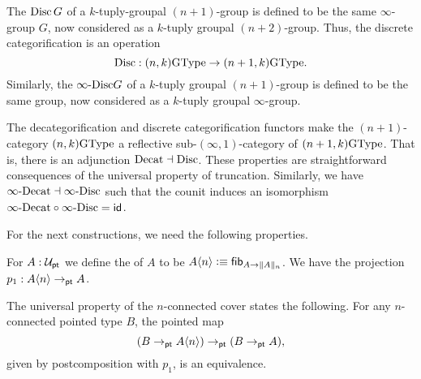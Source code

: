 \begin{defn}
The  $\Disc G$ of a $k$-tuply-groupal $(n+1)$-group is defined to be the same $\infty$-group $G$, now considered as a $k$-tuply groupal $(n+2)$-group. Thus, the discrete categorification is an operation
\begin{equation*}
\Disc : (n,k)\GType \to (n+1,k)\GType.
\end{equation*}
Similarly, the  $\iDisc G$ of a $k$-tuply groupal $(n+1)$-group is defined to be the same group, now considered as a $k$-tuply groupal $\infty$-group.
\end{defn}

\begin{rmk}
The decategorification and discrete categorification functors make the $(n+1)$-category $(n,k)\GType$ a reflective sub-$(\infty,1)$-category of $(n+1,k)\GType$. That is, there is an adjunction ${\Decat} \dashv {\Disc}$. These properties are straightforward consequences of the universal property of truncation.
Similarly, we have ${\iDecat} \dashv {\iDisc}$ such that the counit induces an isomorphism ${\iDecat} \circ {\iDisc} = \idfunc$.
\end{rmk}

For the next constructions, we need the following properties.
\begin{defn}
  For $A : \UU_\pt$ we define the  of $A$ to be 
  $A{\angled n} \defeq  \fibf{A \to \trunc{n}{A}}$. We have the projection $p_1: A{\angled n} \to_\pt A$.
\end{defn}

\begin{lem} \label{lem:connected-cover-univ}
  The universal property of the $n$-connected cover states the following. For any $n$-connected pointed type $B$, the pointed map
  $$(B \to_\pt A{\angled n}) \to_\pt (B \to_\pt A),$$
  given by postcomposition with $p_1$, is an equivalence.\\
\end{lem}

